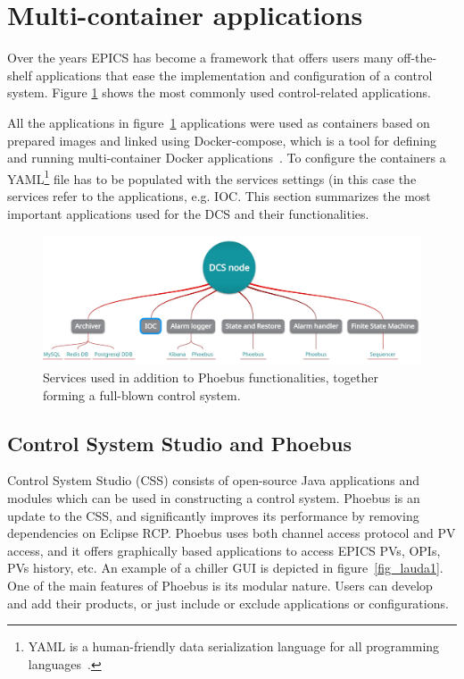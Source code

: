 \section{Multi-container applications}
Over the years \gls{EPICS} has become a framework that offers users many off-the-shelf applications that ease the implementation and configuration of a control system. Figure \ref{fig_dcs_node_msts} shows the most commonly used control-related applications. 

All the applications in figure~\ref{fig_dcs_node_msts} applications were used as containers based on prepared images and linked using Docker-compose, which is a tool for defining and running multi-container Docker applications~\cite{docker_compose}. To configure the containers a YAML\footnote{YAML is a human-friendly data serialization language for all programming languages~\cite{YAML}.} file has to be populated with the services settings (in this case the services refer to the applications, e.g. \gls{IOC}. This section summarizes the most important applications used for the \gls{DCS} and their functionalities.


\begin{figure}[!h]
\centering
\includegraphics[width=0.95\columnwidth]{Chapter4/images/dcs_node.jpg}
\caption{Services used in addition to Phoebus functionalities, together forming a full-blown control system.}
\label{fig_dcs_node_msts}
\end{figure}
\newpage
\subsection{Control System Studio and Phoebus}

Control System Studio (\gls{CSS}) consists of open-source Java applications and modules which can be used in constructing a control system. Phoebus is an update to the \gls{CSS}, and significantly improves its performance by removing dependencies on Eclipse RCP. Phoebus uses both channel access protocol and \gls{PV} access, and it offers graphically based applications to access \gls{EPICS} \glspl{PV}, \glspl{OPI}, PVs history, etc. An example of a chiller \gls{GUI} is depicted in figure~\ref{fig_lauda1}. One of the main features of Phoebus is its modular nature. Users can develop and add their products, or just include or exclude applications or configurations. 


